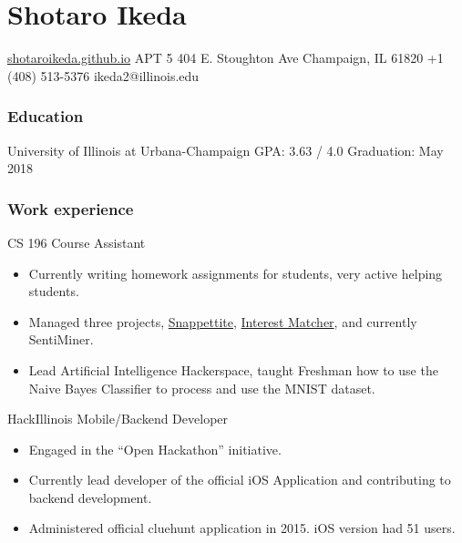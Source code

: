 \documentclass{tccv}
\begin{document}
\part{Shotaro Ikeda}

\personal
{\href{https://shotaroikeda.github.io/}{shotaroikeda.github.io}}
{APT 5 404 E. Stoughton Ave \newline
  Champaign, IL 61820}
{+1 (408) 513-5376}
{ikeda2@illinois.edu}

\section{Education}

\begin{yearlist}

  {University of Illinois at  \newline Urbana-Champaign}
  {GPA: 3.63 / 4.0}
  {Graduation: May 2018}

\end{yearlist}

\section{Work experience}

\begin{eventlist}

  {CS 196}
  {Course Assistant}

  \begin{itemize}
  \item Currently writing homework assignments for students, very active helping students.
  \item Managed three projects, \href{https://github.com/SNAPPETITE}{Snappettite}, \href{https://github.com/InterestMatcher}{Interest Matcher}, and currently SentiMiner.
  \item Lead Artificial Intelligence Hackerspace, taught Freshman how to use the Naive Bayes Classifier to process and use the MNIST dataset.
  \end{itemize}

  {HackIllinois}
  {Mobile/Backend Developer}
  \begin{itemize}
  \item Engaged in the ``Open Hackathon'' initiative.
  \item Currently lead developer of the official iOS Application and contributing to \\
    backend development.
  \item Administered official cluehunt application in 2015. iOS version had 51 users.
  \end{itemize}

\end{eventlist}
\end{document}
